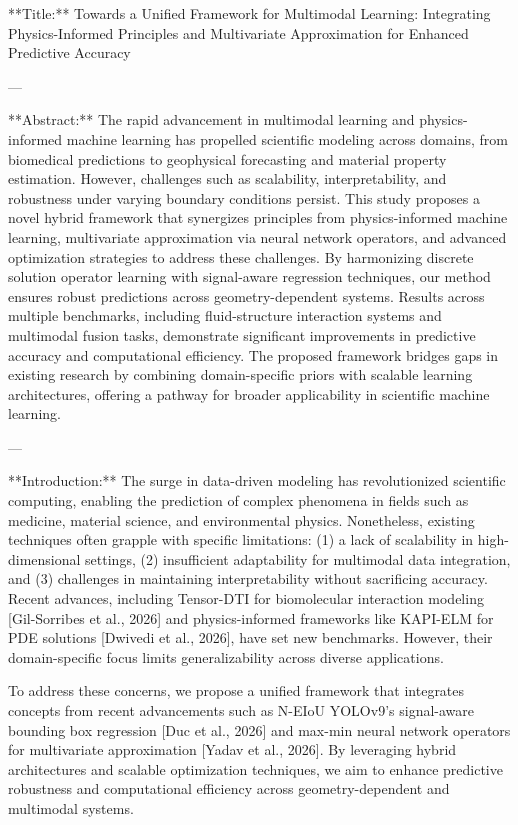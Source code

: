 **Title:**  
Towards a Unified Framework for Multimodal Learning: Integrating Physics-Informed Principles and Multivariate Approximation for Enhanced Predictive Accuracy  

---

**Abstract:**  
The rapid advancement in multimodal learning and physics-informed machine learning has propelled scientific modeling across domains, from biomedical predictions to geophysical forecasting and material property estimation. However, challenges such as scalability, interpretability, and robustness under varying boundary conditions persist. This study proposes a novel hybrid framework that synergizes principles from physics-informed machine learning, multivariate approximation via neural network operators, and advanced optimization strategies to address these challenges. By harmonizing discrete solution operator learning with signal-aware regression techniques, our method ensures robust predictions across geometry-dependent systems. Results across multiple benchmarks, including fluid-structure interaction systems and multimodal fusion tasks, demonstrate significant improvements in predictive accuracy and computational efficiency. The proposed framework bridges gaps in existing research by combining domain-specific priors with scalable learning architectures, offering a pathway for broader applicability in scientific machine learning.

---

**Introduction:**  
The surge in data-driven modeling has revolutionized scientific computing, enabling the prediction of complex phenomena in fields such as medicine, material science, and environmental physics. Nonetheless, existing techniques often grapple with specific limitations: (1) a lack of scalability in high-dimensional settings, (2) insufficient adaptability for multimodal data integration, and (3) challenges in maintaining interpretability without sacrificing accuracy. Recent advances, including Tensor-DTI for biomolecular interaction modeling [Gil-Sorribes et al., 2026] and physics-informed frameworks like KAPI-ELM for PDE solutions [Dwivedi et al., 2026], have set new benchmarks. However, their domain-specific focus limits generalizability across diverse applications.

To address these concerns, we propose a unified framework that integrates concepts from recent advancements such as N-EIoU YOLOv9's signal-aware bounding box regression [Duc et al., 2026] and max-min neural network operators for multivariate approximation [Yadav et al., 2026]. By leveraging hybrid architectures and scalable optimization techniques, we aim to enhance predictive robustness and computational efficiency across geometry-dependent and multimodal systems.

